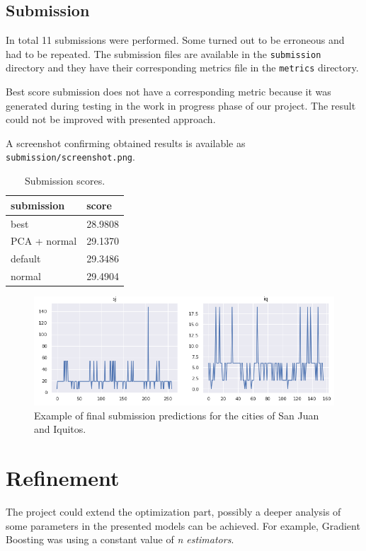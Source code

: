 \documentclass[sigconf]{acmart}
\begin{document}
\subsection{Submission}
In total 11 submissions were performed. Some turned out to be erroneous and had to be repeated.
The submission files are available in the \texttt{submission} directory and they have their corresponding metrics file in the \texttt{metrics} directory.

Best score submission does not have a corresponding metric because it was generated during testing in the work in progress phase of our project. The result could not be improved with presented approach.

A screenshot confirming obtained results is available as \texttt{submission/screenshot.png}.

\begin{table}[h]
    \begin{tabular}{|l|l|}
    \hline
    submission   & score   \\ \hline
    best         & 28.9808 \\
    PCA + normal & 29.1370 \\
    default      & 29.3486 \\
    normal       & 29.4904 \\ \hline
    \end{tabular}
    \caption{Submission scores.}
\end{table}

\begin{figure}[h]
    \includegraphics[width=\linewidth]{8-prediction.png}
    \centering
    \caption{Example of final submission predictions for the cities of San Juan and Iquitos.}
\end{figure}

\section{Refinement}
The project could extend the optimization part, possibly a deeper analysis of some parameters in the presented models can be achieved. For example, Gradient Boosting was using a constant value of \emph{n estimators}.
\end{document}
